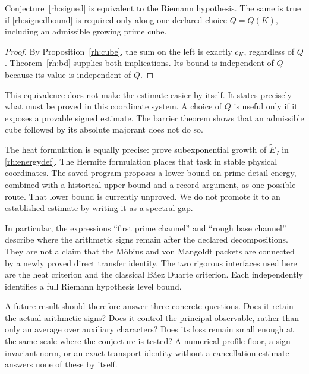 \begin{proposition}\label{rh:conditional}
Conjecture~\ref{rh:signed} is equivalent to the Riemann hypothesis. The same is true if \eqref{rh:signedbound} is required only along one declared choice \(Q=Q(K)\), including an admissible growing prime cube.
\end{proposition}

\begin{proof}
By Proposition~\ref{rh:cube}, the sum on the left is exactly \(c_K\), regardless of \(Q\). Theorem~\ref{rh:bd} supplies both implications. Its bound is independent of \(Q\) because its value is independent of \(Q\).
\end{proof}

This equivalence does not make the estimate easier by itself. It states precisely what must be proved in this coordinate system. A choice of \(Q\) is useful only if it exposes a provable signed estimate. The barrier theorem shows that an admissible cube followed by its absolute majorant does not do so.

The heat formulation is equally precise: prove subexponential growth of \(\widetilde E_J\) in \eqref{rh:energydef}. The Hermite formulation places that task in stable physical coordinates. The saved program proposes a lower bound on prime detail energy, combined with a historical upper bound and a record argument, as one possible route. That lower bound is currently unproved. We do not promote it to an established estimate by writing it as a spectral gap.

In particular, the expressions ``first prime channel'' and ``rough base channel'' describe where the arithmetic signs remain after the declared decompositions. They are not a claim that the Möbius and von Mangoldt packets are connected by a newly proved direct transfer identity. The two rigorous interfaces used here are the heat criterion and the classical Báez Duarte criterion. Each independently identifies a full Riemann hypothesis level bound.

A future result should therefore answer three concrete questions. Does it retain the actual arithmetic signs? Does it control the principal observable, rather than only an average over auxiliary characters? Does its loss remain small enough at the same scale where the conjecture is tested? A numerical profile floor, a sign invariant norm, or an exact transport identity without a cancellation estimate answers none of these by itself.


